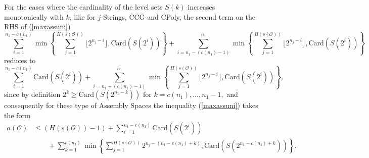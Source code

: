 \documentclass[letterpaper,12pt]{article}
\theoremstyle{definition}
\begin{document}
For the cases where the cardinality of the level sets $S(k)$ increases monotonically with $k$, like for $j$-Strings, CCG and CPoly, the second term on the RHS of (\ref{maxassuni}) 
\begin{equation*}
\sum_{i=1}^{n_1-c(n_1)} \min \left\{ \sum_{j=1}^{H(s(\mathscr{O}))} \lfloor 2^{n_j-i} \rfloor, \text{Card}(S(2^i))  \right\} + \sum_{i=n_1-(c(n_1)-1)}^{n_1} \min \left\{ \sum_{j=1}^{H(s(\mathscr{O}))} \lfloor 2^{n_j-i} \rfloor, \text{Card}(S(2^i))  \right\}
\end{equation*}
reduces to 
\begin{equation*}
   \sum_{i=1}^{n_1-c(n_1)} \text{Card}(S(2^i))  + \sum_{i=n_1-(c(n_1)-1)}^{n_1} \min \left\{ \sum_{j=1}^{H(s(\mathscr{O}))} \lfloor 2^{n_j-i} \rfloor, \text{Card}(S(2^i))  \right\}, 
\end{equation*}
since by definition $2^{k} \geq \text{Card}(S(2^{n_1-k}))$ for $k=c(n_1),\dots,n_1-1,$ and consequently for these type of Assembly Spaces the inequality (\ref{maxassuni}) takes the form  
    \begin{equation}\label{maxassunialt}
\begin{split}
    {a}(\mathscr{O}) & \leq (H(s(\mathscr{O}))-1) + \sum_{i=1}^{n_1-c(n_1)} \text{Card}(S(2^i)) \\
    & \qquad + \sum_{k=1}^{c(n_1)} \min \left\{ \sum_{j=1}^{H(s(\mathscr{O}))} 2^{n_j-(n_1-c(n_1)+k)}, \text{Card}(S(2^{n_1-c(n_1)+k})) \right\}.
    \end{split}
\end{equation} 
\end{document}
